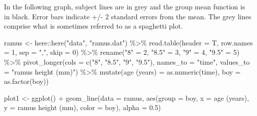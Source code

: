 \documentclass[
  9pt,
  ignorenonframetext,
]{beamer}
\newenvironment{Shaded}{\begin{snugshade}}{\end{snugshade}}
\newcommand{\AttributeTok}[1]{\textcolor[rgb]{0.77,0.63,0.00}{#1}}
\newcommand{\DecValTok}[1]{\textcolor[rgb]{0.00,0.00,0.81}{#1}}
\newcommand{\FloatTok}[1]{\textcolor[rgb]{0.00,0.00,0.81}{#1}}
\newcommand{\FunctionTok}[1]{\textcolor[rgb]{0.00,0.00,0.00}{#1}}
\newcommand{\NormalTok}[1]{#1}
\newcommand{\OtherTok}[1]{\textcolor[rgb]{0.56,0.35,0.01}{#1}}
\newcommand{\SpecialCharTok}[1]{\textcolor[rgb]{0.00,0.00,0.00}{#1}}
\newcommand{\StringTok}[1]{\textcolor[rgb]{0.31,0.60,0.02}{#1}}
\begin{document}
\begin{frame}[fragile]{}
\protect\hypertarget{section-1}{}
In the following graph, subject lines are in grey and the group mean
function is in black. Error bars indicate +/- 2 standard errors from the
mean. The grey lines comprise what is sometimes referred to as a
spaghetti plot.

\tiny

\begin{Shaded}
\begin{Highlighting}[]
\NormalTok{ramus }\OtherTok{\textless{}{-}}\NormalTok{ here}\SpecialCharTok{::}\FunctionTok{here}\NormalTok{(}\StringTok{"data"}\NormalTok{, }\StringTok{"ramus.dat"}\NormalTok{) }\SpecialCharTok{\%\textgreater{}\%}
  \FunctionTok{read.table}\NormalTok{(}\AttributeTok{header =}\NormalTok{ T, }\AttributeTok{row.names =} \DecValTok{1}\NormalTok{,}
             \AttributeTok{sep =} \StringTok{","}\NormalTok{,  }\AttributeTok{skip =} \DecValTok{0}\NormalTok{) }\SpecialCharTok{\%\textgreater{}\%}
  \FunctionTok{rename}\NormalTok{(}\StringTok{"8"} \OtherTok{=} \DecValTok{2}\NormalTok{, }\StringTok{"8.5"} \OtherTok{=} \DecValTok{3}\NormalTok{, }\StringTok{"9"} \OtherTok{=} \DecValTok{4}\NormalTok{, }\StringTok{"9.5"} \OtherTok{=} \DecValTok{5}\NormalTok{) }\SpecialCharTok{\%\textgreater{}\%}
  \FunctionTok{pivot\_longer}\NormalTok{(}\AttributeTok{cols =} \FunctionTok{c}\NormalTok{(}\StringTok{"8"}\NormalTok{, }\StringTok{"8.5"}\NormalTok{, }\StringTok{"9"}\NormalTok{, }\StringTok{"9.5"}\NormalTok{), }
               \AttributeTok{names\_to =} \StringTok{"time"}\NormalTok{, }
               \AttributeTok{values\_to =} \StringTok{"ramus height (mm)"}\NormalTok{) }\SpecialCharTok{\%\textgreater{}\%}
  \FunctionTok{mutate}\NormalTok{(}\StringTok{\textasciigrave{}}\AttributeTok{age (years)}\StringTok{\textasciigrave{}} \OtherTok{=} \FunctionTok{as.numeric}\NormalTok{(time),}
         \AttributeTok{boy =} \FunctionTok{as.factor}\NormalTok{(boy))}

\NormalTok{plot1 }\OtherTok{\textless{}{-}} \FunctionTok{ggplot}\NormalTok{() }\SpecialCharTok{+}
  \FunctionTok{geom\_line}\NormalTok{(}\AttributeTok{data =}\NormalTok{ ramus, }
            \FunctionTok{aes}\NormalTok{(}\AttributeTok{group =}\NormalTok{ boy,}
                \AttributeTok{x =} \StringTok{\textasciigrave{}}\AttributeTok{age (years)}\StringTok{\textasciigrave{}}\NormalTok{,}
                \AttributeTok{y =} \StringTok{\textasciigrave{}}\AttributeTok{ramus height (mm)}\StringTok{\textasciigrave{}}\NormalTok{,}
                \AttributeTok{color =}\NormalTok{ boy), }
            \AttributeTok{alpha =} \FloatTok{0.5}\NormalTok{) }
\end{Highlighting}
\end{Shaded}

\tiny
\end{frame}
\end{document}
